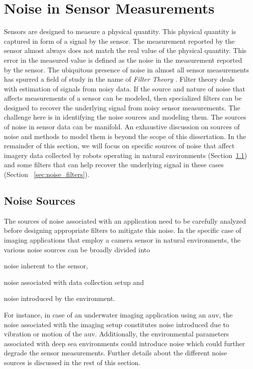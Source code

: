 \documentclass {udthesis}
\begin{document}
\section{Noise in Sensor Measurements}

Sensors are designed to measure a physical quantity. This physical quantity is captured in form of a signal by the sensor.
The measurement reported by the sensor almost always does not match the real value of the physical quantity.
This error in the measured value is defined as the noise in the measurement reported by the sensor.
The ubiquitous presence of noise in almost all sensor measurements has spurred a field of study in the name of 
\emph{Filter Theory} \cite{haykin}. Filter theory deals with estimation of signals from noisy data. 
If the source and nature of noise that affects measurements of a sensor can be modeled, then specialized
filters can be designed to recover the underlying signal from noisy sensor measurements.
The challenge here is in identifying the noise sources and modeling them. 
The sources of noise in sensor data can be manifold. An exhaustive discussion on sources of noise and methods to model them
is beyond the scope of this dissertation. In the remainder of this section, we will focus on specific sources of noise that affect 
imagery data collected by robots operating in natural environments (Section~\ref{sec:noise_sources}) and some filters that can 
help recover the underlying signal in these cases (Section ~\ref{sec:noise_filters}).

\subsection{Noise Sources}
\label{sec:noise_sources}

The sources of noise associated with an application need to be carefully analyzed before designing appropriate filters to mitigate this noise.
In the specific case of imaging applications that employ a camera sensor in natural environments, the various noise sources can be broadly divided
into \begin{enumerate*}[label=(\roman*)] \item noise inherent to the sensor, \item noise associated with data collection setup and \item noise introduced by the environment. \end{enumerate*} For instance, in case of an underwater imaging application using an \gls{auv}, the noise associated with the imaging setup constitutes noise introduced due to vibration or motion of the \gls{auv}. Additionally, the environmental parameters associated with deep sea environments could introduce noise which could further degrade the sensor measurements. Further details about the different noise sources is discussed in the rest of this section.
\end{document}
